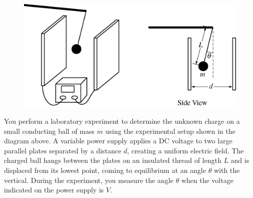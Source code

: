 %
\begin{figure}[H]
\centering
\includegraphics[scale=0.2]{images/img-016-042.png}
\end{figure}


\question
You perform a laboratory experiment to determine the unknown charge on a small conducting ball of mass $m$ using the experimental setup shown in the diagram above. A variable power supply applies a DC voltage to two large parallel plates separated by a distance $d$, creating a uniform electric field. The charged ball hangs between the plates on an insulated thread of length $L$ and is displaced from its lowest point, coming to equilibrium at an angle $\theta$ with the vertical. During the experiment, you measure the angle $\theta$ when the voltage indicated on the power supply is $V$. %

